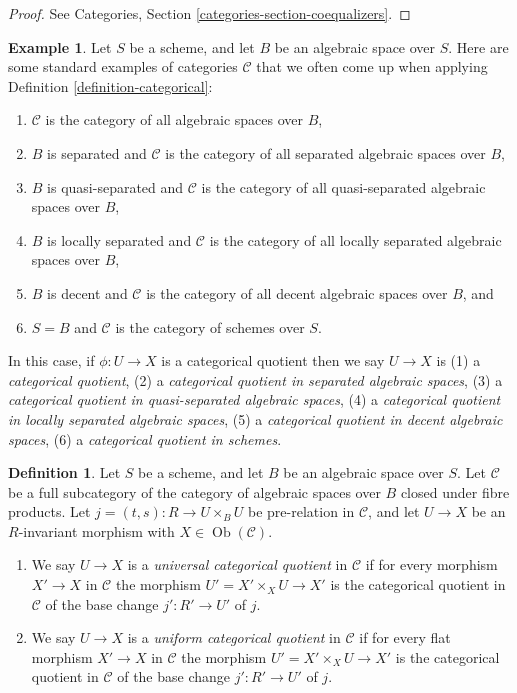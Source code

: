 \documentclass{stacks-project}
\theoremstyle{plain}
\theoremstyle{definition}
\newtheorem{definition}[subsection]{Definition}
\newtheorem{example}[subsection]{Example}
\theoremstyle{remark}
\numberwithin{equation}{subsection}
\def\Ob{\mathop{\mathrm{Ob}}\nolimits}
\begin{document}
\begin{proof}
See Categories, Section \ref{categories-section-coequalizers}.
\end{proof}

\begin{example}
\label{example-categories}
Let $S$ be a scheme, and let $B$ be an algebraic space over $S$.
Here are some standard examples of categories $\mathcal{C}$
that we often come up when applying
Definition \ref{definition-categorical}:
\begin{enumerate}
\item $\mathcal{C}$ is the category of all algebraic spaces over $B$,
\item $B$ is separated and $\mathcal{C}$ is the category of all separated
algebraic spaces over $B$,
\item $B$ is quasi-separated and $\mathcal{C}$ is the category of all
quasi-separated algebraic spaces over $B$,
\item $B$ is locally separated and $\mathcal{C}$ is the category of all
locally separated algebraic spaces over $B$,
\item $B$ is decent and $\mathcal{C}$ is the category of all decent algebraic
spaces over $B$, and
\item $S = B$ and $\mathcal{C}$ is the category of schemes over $S$.
\end{enumerate}
In this case, if $\phi : U \to X$ is a categorical quotient then we say
$U \to X$ is
(1) a {\it categorical quotient},
(2) a {\it categorical quotient in separated algebraic spaces},
(3) a {\it categorical quotient in quasi-separated algebraic spaces},
(4) a {\it categorical quotient in locally separated algebraic spaces},
(5) a {\it categorical quotient in decent algebraic spaces},
(6) a {\it categorical quotient in schemes}.
\end{example}

\begin{definition}
\label{definition-universal-categorical}
Let $S$ be a scheme, and let $B$ be an algebraic space over $S$.
Let $\mathcal{C}$ be a full subcategory of the category of algebraic
spaces over $B$ closed under fibre products.
Let $j = (t, s) : R \to U \times_B U$ be pre-relation in
$\mathcal{C}$, and let $U \to X$ be an $R$-invariant morphism with
$X \in \Ob(\mathcal{C})$.
\begin{enumerate}
\item We say $U \to X$ is a {\it universal categorical quotient}
in $\mathcal{C}$ if for every morphism $X' \to X$ in $\mathcal{C}$
the morphism $U' = X' \times_X U \to X'$ is the categorical quotient in
$\mathcal{C}$ of the base change $j' : R' \to U'$ of $j$.
\item We say $U \to X$ is a {\it uniform categorical quotient}
in $\mathcal{C}$ if for every flat morphism $X' \to X$ in $\mathcal{C}$
the morphism $U' = X' \times_X U \to X'$ is the categorical quotient in
$\mathcal{C}$ of the base change $j' : R' \to U'$ of $j$.
\end{enumerate}
\end{definition}
\end{document}
